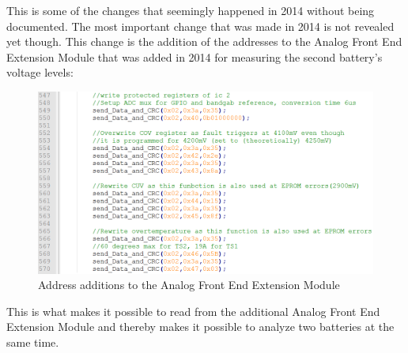 This is some of the changes that seemingly happened in 2014 without being documented. The most important change that was made in 2014 is not revealed yet though. This change is the addition of the addresses to the Analog Front End Extension Module that was added in 2014 for measuring the second battery's voltage levels:\\
\begin{figure}[H]
	\centering
	\includegraphics[width=1.0\linewidth]{Software/AddressAdditionsBMS.PNG}
	\caption{Address additions to the Analog Front End Extension Module}
	\label{fig:AddressAdditions_BMS}
\end{figure}

This is what makes it possible to read from the additional Analog Front End Extension Module and thereby makes it possible to analyze two batteries at the same time.



